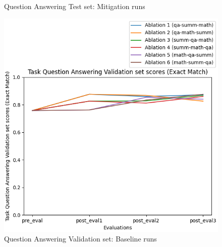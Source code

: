 \begin{figure}[H]
\begin{minipage}{0.45\textwidth}
        \captionsetup{width=1.1\textwidth}
        \caption{Question Answering Test set: Mitigation runs}
        \label{QATestMitigation}
    \end{minipage}
\end{figure}

\begin{figure}[H]
    \centering
    \begin{minipage}{0.45\textwidth}
        \centering
        \includegraphics[width=1.1\textwidth]{Figures/results/trace_baseline_graphs/task_eval/qa_val_Validation_baseline.png} %
        \captionsetup{width=1.1\textwidth}
        \caption{Question Answering Validation set: Baseline runs}
        \label{QAValBaseline}
    \end{minipage}\hfill
    \begin{minipage}{0.45\textwidth}
        \centering

\end{minipage}
\end{figure}

